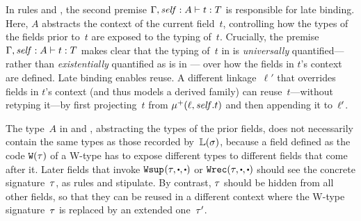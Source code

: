 In rules  and ,
the second premise $ {\Gamma, \mathit{self} : A} \vdash {t} : {T} $ is
responsible for late binding.
Here, $A$ abstracts the context of the current field~$t$, controlling
how the types of the fields prior to~$t$ are exposed to the typing of~$t$.
Crucially, %
the premise $ {\Gamma, \mathit{self} : A} \vdash {t} : {T} $ makes clear that
the typing of~$t$ in  is \emph{universally} quantified---%
rather than \emph{existentially} quantified as is in ---%
over how the fields in $t$'s context are defined.
Late binding enables reuse.
A different linkage~$\ell'$ that overrides fields in $t$'s context (and thus models a derived family)
can reuse~$t$---without retyping it---by first
projecting~$t$ from $\mu^+({\ell},{\mathit{self}.t})$ and then appending it to~$\ell'$.

The type~$A$ in  and ,
abstracting the types of the prior fields, does not necessarily contain the same types as those recorded by~$\mathbb{L}({\sigma})$,
because a field defined as the code $\texttt{W}({\tau})$ of a W-type has to
expose different types to different fields that come after it.
Later fields that invoke
$\Wsup{}{\wsig}{\cDot}{\cDot}$ or $\Wrec{\wsig}{\cDot}{\cDot}$
should see the concrete signature~$\tau$, as rules 
and  stipulate.
By contrast, $\tau$ should be hidden
from all other fields, so that they can be reused
in a different context where the W-type signature~$\tau$ is replaced by an extended one~$\tau'$.




